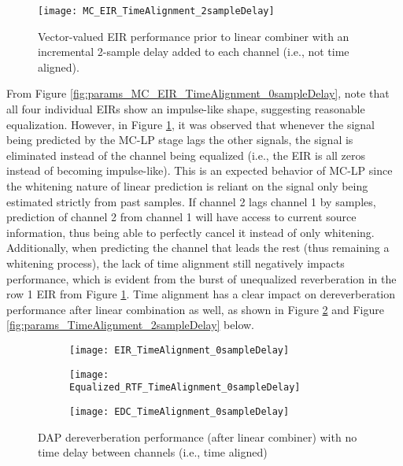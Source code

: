 \begin{figure}[H]
	\texttt{[image: MC\_EIR\_TimeAlignment\_2sampleDelay]}
	\centering
	\caption[DAP dereverberation performance pre-linear combiner for non time-aligned RIRs]{Vector-valued EIR performance prior to linear combiner with an incremental 2-sample delay added to each channel (i.e., not time aligned).}
	\label{fig:params_MC_EIR_TimeAlignment_2sampleDelay}
\end{figure}


From Figure \ref{fig:params_MC_EIR_TimeAlignment_0sampleDelay}, note that all four individual EIRs show an impulse-like shape, suggesting reasonable equalization. However, in Figure \ref{fig:params_MC_EIR_TimeAlignment_2sampleDelay}, it was observed that whenever the signal being predicted by the MC-LP stage lags the other signals, the signal is eliminated instead of the channel being equalized (i.e., the EIR is all zeros instead of becoming impulse-like). This is an expected behavior of MC-LP since the whitening nature of linear prediction is reliant on the signal only being estimated strictly from past samples. If channel 2 lags channel 1 by samples, prediction of channel 2 from channel 1 will have access to current source information, thus being able to perfectly cancel it instead of only whitening. Additionally, when predicting the channel that leads the rest (thus remaining a whitening process), the lack of time alignment still negatively impacts performance, which is evident from the burst of unequalized reverberation in the row 1 EIR from Figure \ref{fig:params_MC_EIR_TimeAlignment_2sampleDelay}. Time alignment has a clear impact on dereverberation performance after linear combination as well, as shown in Figure \ref{fig:params_TimeAlignment_0sampleDelay} and Figure \ref{fig:params_TimeAlignment_2sampleDelay} below.


\begin{figure}[H]
	\centering
	\begin{subfigure}[b]{0.32\textwidth}
		\centering
		\texttt{[image: EIR\_TimeAlignment\_0sampleDelay]}
	\end{subfigure}
	\hfill
	\begin{subfigure}[b]{0.32\textwidth}
		\centering
		\texttt{[image: Equalized\_RTF\_TimeAlignment\_0sampleDelay]}
	\end{subfigure}
	\hfill
	\begin{subfigure}[b]{0.32\textwidth}
		\centering
		\texttt{[image: EDC\_TimeAlignment\_0sampleDelay]}
	\end{subfigure}
	\hfill
	\caption[DAP dereverberation performance for time-aligned RIRs]{DAP dereverberation performance (after linear combiner) with no time delay between channels (i.e., time aligned)}
	\label{fig:params_TimeAlignment_0sampleDelay}
\end{figure}

